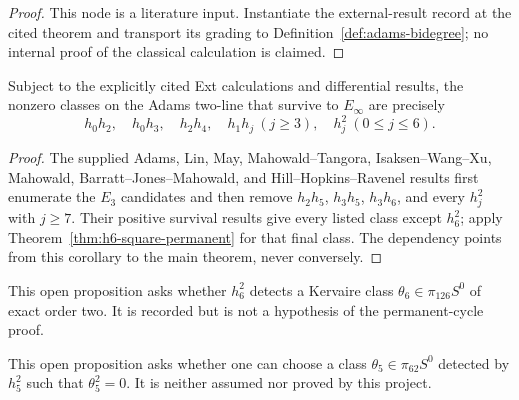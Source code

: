 \begin{proof}
  This node is a literature input.  Instantiate the external-result record at
  the cited theorem and transport its grading to
  Definition~\ref{def:adams-bidegree}; no internal proof of the classical
  calculation is claimed.
\end{proof}

\begin{corollary}
  \label{cor:adams-two-line-survivors}
  \notready
  Subject to the explicitly cited Ext calculations and differential results,
  the nonzero classes on the Adams two-line that survive to $E_\infty$ are
  precisely
  \[
    h_0h_2,\quad h_0h_3,\quad h_2h_4,\quad
    h_1h_j\ (j\ge3),\quad h_j^2\ (0\le j\le6).
  \]
\end{corollary}

\begin{proof}
  The supplied Adams, Lin, May, Mahowald--Tangora, Isaksen--Wang--Xu,
  Mahowald, Barratt--Jones--Mahowald, and Hill--Hopkins--Ravenel results first
  enumerate the $E_3$ candidates and then remove $h_2h_5$, $h_3h_5$,
  $h_3h_6$, and every $h_j^2$ with $j\ge7$.  Their positive survival results
  give every listed class except $h_6^2$; apply
  Theorem~\ref{thm:h6-square-permanent} for that final class.  The dependency
  points from this corollary to the main theorem, never conversely.
\end{proof}

\begin{definition}
  \label{def:question-order-two-theta6}
  \notready
  This open proposition asks whether $h_6^2$ detects a Kervaire class
  $\theta_6\in\pi_{126}S^0$ of exact order two.  It is recorded but is not a
  hypothesis of the permanent-cycle proof.
\end{definition}

\begin{definition}[$\theta_5^2=0$ question]
  \label{def:question-theta5-square-zero}
  \notready
  This open proposition asks whether one can choose a class
  $\theta_5\in\pi_{62}S^0$ detected by $h_5^2$ such that
  $\theta_5^2=0$.  It is neither assumed nor proved by this project.
\end{definition}
